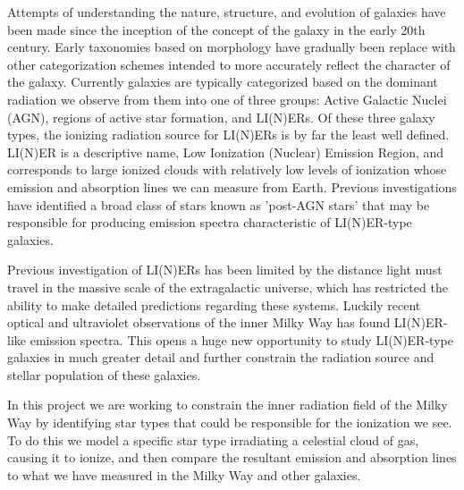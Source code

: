 


Attempts of understanding the nature, structure, and evolution of galaxies have been made since the inception of the concept of the galaxy in the early 20th century. Early taxonomies based on morphology have gradually been replace with other categorization schemes intended to more accurately reflect the character of the galaxy. Currently galaxies are typically categorized based on the dominant radiation we observe from them into one of three groups: Active Galactic Nuclei (AGN), regions of active star formation, and LI(N)ERs.\cite{bpt-paper} Of these three galaxy types, the ionizing radiation source for LI(N)ERs is by far the least well defined.\cite{byler-emission-line-predictions} LI(N)ER is a descriptive name, Low Ionization (Nuclear) Emission Region, and corresponds to large ionized clouds with relatively low levels of ionization whose emission and absorption lines we can measure from Earth.  Previous investigations have identified a broad class of stars known as 'post-AGN stars' that may be responsible for producing emission spectra characteristic of LI(N)ER-type galaxies\cite{byler-emission-line-predictions}.


  Previous investigation of LI(N)ERs has been limited by the distance light must travel in the massive scale of the extragalactic universe, which has restricted the ability to make detailed predictions regarding these systems. Luckily recent optical and ultraviolet observations of the inner Milky Way has found LI(N)ER-like emission spectra.\cite{inner-galaxy-liner-like-gas} This opens a huge new opportunity to study LI(N)ER-type galaxies in much greater detail and further constrain the radiation source and stellar population of these galaxies.


In this project we are working to constrain the inner radiation field of the Milky Way by identifying star types that could be responsible for the ionization we see. To do this we model a specific star type irradiating a celestial cloud of gas, causing it to ionize, and then compare the resultant emission and absorption lines to what we have measured in the Milky Way and other galaxies.


